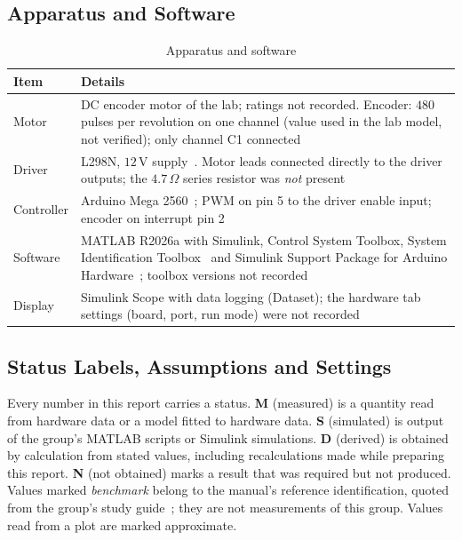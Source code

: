 \documentclass[lettersize,journal]{IEEEtran}
\begin{document}
\subsection{Apparatus and Software}
\begin{table}[H]
\centering
\caption{Apparatus and software}
\label{tab:apparatus}
\begin{tabular}{@{}p{2.3cm}p{5.8cm}@{}}
\toprule
Item & Details \\
\midrule
Motor & DC encoder motor of the lab; ratings not recorded. Encoder: $480$ pulses per revolution on one channel (value used in the lab model, not verified); only channel C1 connected \\
Driver & L298N, $12\,\text{V}$ supply~\cite{l298}. Motor leads connected directly to the driver outputs; the $4.7\,\Omega$ series resistor was \emph{not} present \\
Controller & Arduino Mega 2560~\cite{arduino_mega}; PWM on pin 5 to the driver enable input; encoder on interrupt pin 2 \\
Software & MATLAB R2026a with Simulink, Control System Toolbox, System Identification Toolbox~\cite{mw_sysid} and Simulink Support Package for Arduino Hardware~\cite{mw_arduino}; toolbox versions not recorded \\
Display & Simulink Scope with data logging (Dataset); the hardware tab settings (board, port, run mode) were not recorded \\
\bottomrule
\end{tabular}
\end{table}

\subsection{Status Labels, Assumptions and Settings}
\label{sec:status}
Every number in this report carries a status. \textbf{M} (measured) is a quantity read from hardware data or a model fitted to hardware data. \textbf{S} (simulated) is output of the group's MATLAB scripts or Simulink simulations. \textbf{D} (derived) is obtained by calculation from stated values, including recalculations made while preparing this report. \textbf{N} (not obtained) marks a result that was required but not produced. Values marked \emph{benchmark} belong to the manual's reference identification, quoted from the group's study guide~\cite{studyguide}; they are not measurements of this group. Values read from a plot are marked approximate.
\end{document}
